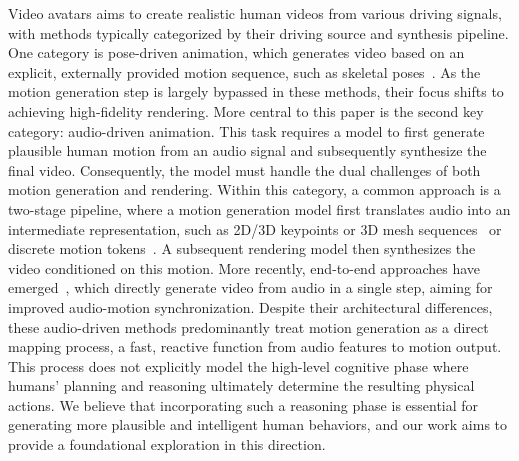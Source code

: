  Video avatars aims to create realistic human videos from various driving signals, with methods typically categorized by their driving source and synthesis pipeline. One category is pose-driven animation, which generates video based on an explicit, externally provided motion sequence, such as skeletal poses~\cite{zhang2024mimicmotion, shao2024human4dit,chang2023magicpose,tu2024motionfollower,wang2024unianimate,karras2023dreampose,xu2024magicanimate}. As the motion generation step is largely bypassed in these methods, their focus shifts to achieving high-fidelity rendering. More central to this paper is the second key category: audio-driven animation. This task requires a model to first generate plausible human motion from an audio signal and subsequently synthesize the final video. Consequently, the model must handle the dual challenges of both motion generation and rendering. Within this category, a common approach is a two-stage pipeline, where a motion generation model first translates audio into an intermediate representation, such as 2D/3D keypoints or 3D mesh sequences~\cite{zhuang2024vlogger, meng2025echomimicv2,deng2025stereo,wei2024aniportrait} or discrete motion tokens~\cite{hogue2024diffted, tian2025emo2}. A subsequent rendering model then synthesizes the video conditioned on this motion. More recently, end-to-end approaches have emerged~\cite{lin2025cyberhost,lin2025omnihuman,wang2025interacthuman,liang2025alignhuman}, which directly generate video from audio in a single step, aiming for improved audio-motion synchronization.
Despite their architectural differences, these audio-driven methods predominantly treat motion generation as a direct mapping process, a fast, reactive function from audio features to motion output. This process does not explicitly model the high-level cognitive phase where humans' planning and reasoning ultimately determine the resulting physical actions. We believe that incorporating such a reasoning phase is essential for generating more plausible and intelligent human behaviors, and our work aims to provide a foundational exploration in this direction.


